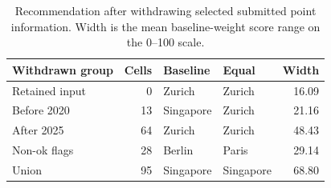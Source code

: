 \begin{table}[!ht]\centering
\caption{Recommendation after withdrawing selected submitted point information. Width is the mean baseline-weight score range on the 0--100 scale.}\label{tab:vintage}
\begin{tabular}{l r l l r}\toprule
Withdrawn group & Cells & Baseline & Equal & Width\\\midrule
Retained input & 0 & Zurich & Zurich & 16.09 \\
Before 2020 & 13 & Singapore & Zurich & 21.16 \\
After 2025 & 64 & Zurich & Zurich & 48.43 \\
Non-ok flags & 28 & Berlin & Paris & 29.14 \\
Union & 95 & Singapore & Singapore & 68.80 \\
\bottomrule\end{tabular}\end{table}
